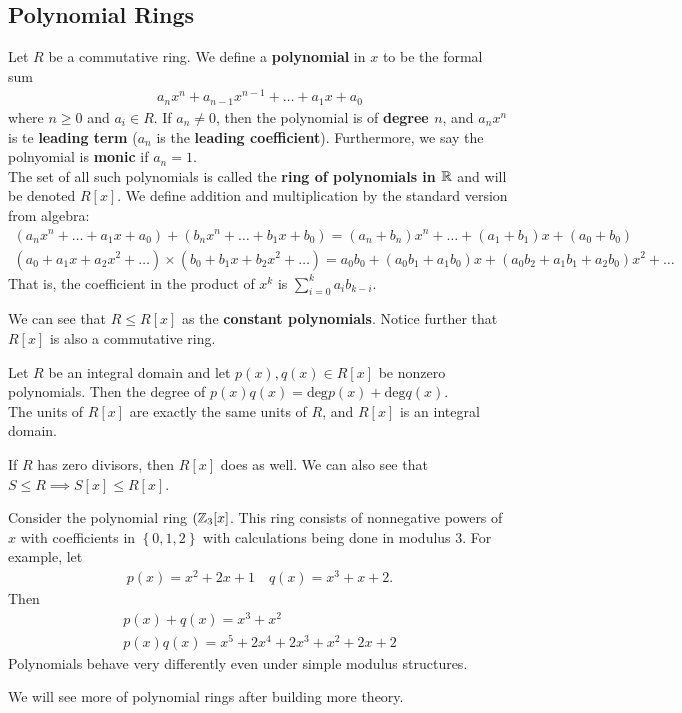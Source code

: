 \documentclass{memoir}
\begin{document}
\subsection{Polynomial Rings}
\label{sub:polynomial_rings}

\begin{defn}
	Let \(R\) be a commutative ring. We define a \textbf{polynomial} in \(x\) to be the formal sum
	\begin{align*}
		a_n x^{n} + a_{n-1}x^{n-1} + \ldots + a_1 x + a_0
	\end{align*}
	where \(n\geq 0\) and \(a_i \in R\). If \(a_n \neq 0\), then the polynomial is of \textbf{degree \(n\)}, and \(a_nx^{n}\) is te \textbf{leading term} (\(a_n\) is the \textbf{leading coefficient}). Furthermore, we say the polnyomial is \textbf{monic} if \(a_n=1\).\\

	The set of all such polynomials is called the \textbf{ring of polynomials in \(\mathbb{R}\)} and will be denoted \(R[x]\). We define addition and multiplication by the standard version from algebra:
	\begin{align*}
		(a_nx^{n} + \ldots + a_1x + a_0) + (b_nx^{n} + \ldots + b_1x + b_0) = (a_n+b_n)x^{n} + \ldots + (a_1+b_1)x + (a_0 + b_0)\\
		(a_0+a_1x + a_2x^2+\ldots) \times (b_0 + b_1x + b_2x^2 + \ldots) = a_0b_0 + (a_0b_1 + a_1b_0)x + (a_0b_2 + a_1b_1 + a_2b_0)x^2 + \ldots
	\end{align*}
	That is, the coefficient in the product of \(x^{k}\) is \(\sum_{i=0}^{k} a_i b_{k-i}\).
\end{defn}
We can see that \(R\leq R[x]\) as the \textbf{constant polynomials}. Notice further that \(R[x]\) is also a commutative ring.

\begin{prop}
	Let \(R\) be an integral domain and let \(p(x),q(x) \in R[x]\) be nonzero polynomials. Then the degree of \(p(x)q(x) = \textrm{deg}p(x) + \textrm{deg}q(x)\).\\

	The units of \(R[x]\) are exactly the same units of \(R\), and \(R[x]\) is an integral domain.
\end{prop}
If \(R\) has zero divisors, then \(R[x]\) does as well. We can also see that \(S\leq R \implies S[x] \leq R[x]\).

\begin{exmp}
	Consider the polynomial ring \((\mathbb{Z}_3[x]\). This ring consists of nonnegative powers of \(x\) with coefficients in \(\left\{ 0,1,2 \right\} \) with calculations being done in modulus \(3\). For example, let
	\begin{align*}
		p(x) = x^2+2x+1 \quad q(x) = x^3+x +2.
	\end{align*}
	Then
	\begin{align*}
		p(x) + q(x) = x^3+x^2\\
		p(x)q(x) = x^{5}+2x^{4}+2x^3+x^2+2x+2
	\end{align*}
	Polynomials behave very differently even under simple modulus structures.
\end{exmp}
We will see more of polynomial rings after building more theory.
\end{document}
